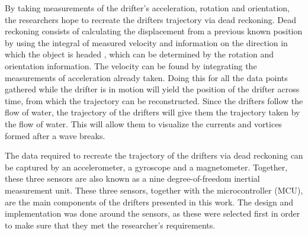 By taking measurements of the drifter's acceleration, rotation and orientation, the researchers hope to recreate the drifters trajectory via dead reckoning.  Dead reckoning consists of calculating the displacement from a previous known position by using the integral of measured velocity and information on the direction in which the object is headed \cite{Jirawimut2001}, which can be determined by the rotation and orientation information.  The velocity can be found by integrating the measurements of acceleration already taken.  Doing this for all the data points gathered while the drifter is in motion will yield the position of the drifter across time, from which the trajectory can be reconstructed.  Since the drifters follow the flow of water, the trajectory of the drifters will give them the trajectory taken by the flow of water.  This will allow them to visualize the currents and vortices formed after a wave breaks.

The data required to recreate the trajectory of the drifters via dead reckoning can be captured by an accelerometer, a gyroscope and a magnetometer.  Together, these three sensors are also known as a nine degree-of-freedom inertial measurement  unit.  These three sensors, together with the microcontroller (MCU), are the main components of the drifters presented in this work.  The design and implementation was done around the sensors, as these were selected first in order to make sure that they met the researcher's requirements.


